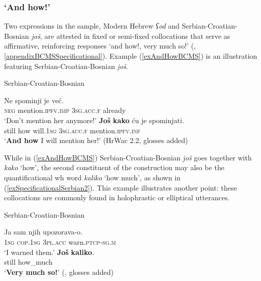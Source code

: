 \subsubsection{\lq And how!\rq{}}\label{sectionAndHow}
 Two expressions in the sample, Modern Hebrew \textit{ʕod} and Serbian\hyp Croatian\hyp Bosnian \textit{još}, are attested in fixed or semi-fixed collocations that serve as affirmative, reinforcing responses \lq and how!, very much so!\rq{ } (, \ref{appendixBCMSSpecificational}). Example (\ref{exAndHowBCMS}) is an illustration featuring Serbian-Croatian-Bosnian \textit{još}.\pagebreak

\begin{exe}
		\ex Serbian-Croatian-Bosnian\label{exAndHowBCMS}
		\begin{xlist}
		 \gll Ne spominji je već.\\
		\textsc{neg} mention.\textsc{ipfv}.\textsc{imp} 3\textsc{sg}.\textsc{acc}.\textsc{f} already\\
		\glt \lq Don't mention her anymore!'
		 \gll \textbf{Još} \textbf{kako} ću je spominjati.\\
		still how will.1\textsc{sg} 3\textsc{sg}.\textsc{acc}.\textsc{f} mention.\textsc{ipfv}.\textsc{inf}\\
		\glt \lq \textbf{And how} I will mention her!' (HrWac 2.2, glosses added)
		\end{xlist}
\end{exe}

While in  (\ref{exAndHowBCMS}) Serbian-Croatian-Bosnian \textit{još} goes together with \textit{kako} \lq how\rq{}, the second constituent of the construction may also be the quantificational wh word \textit{kaliko} \lq how much\rq{}, as shown in (\ref{exSpecificationalSerbian2}). This example illustrates another point: these collocations are commonly found in holophrastic or elliptical utterances.

\begin{exe}
	\ex Serbian-Croatian-Bosnian\label{exSpecificationalSerbian2}
	\begin{xlist}
	\gll Ja sam njih upozorava-o.\\
	1\textsc{sg} \textsc{cop}.1\textsc{sg} 3\textsc{pl}.\textsc{acc} warn.\textsc{ptcp}-\textsc{sg}.\textsc{m}\\
	\glt \lq I warned them.'
	\gll \textbf{Još} \textbf{kaliko}.\\
	still how\_much\\
	\glt \lq \textbf{Very much so!}' (\cite[s.v. \textit{još}]{HJP}, glosses added)
	\end{xlist}
\end{exe}

